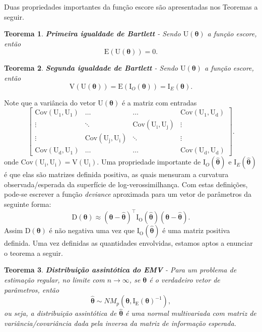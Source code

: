 \documentclass[
  9pt,
  a5paper,
]{book}
\newtheorem{theorem}{Teorema}[chapter]
\theoremstyle{definition}
\theoremstyle{definition}
\theoremstyle{definition}
\theoremstyle{definition}
\theoremstyle{remark}
\begin{document}
Duas propriedades importantes da função escore são apresentadas nos Teoremas a seguir.

\begin{theorem}
\protect\hypertarget{thm:EU}{}\label{thm:EU}\textbf{Primeira igualdade de Bartlett} - Sendo \(\mathrm{U}(\boldsymbol{\theta})\) a função escore, então
\[\mathrm{E}(\mathrm{U}(\boldsymbol{\theta})) = 0.\]
\end{theorem}

\begin{theorem}
\protect\hypertarget{thm:VU}{}\label{thm:VU}\textbf{Segunda igualdade de Bartlett} - Sendo \(\mathrm{U}(\boldsymbol{\theta})\) a função escore, então
\[\mathrm{V}(\mathrm{U}(\boldsymbol{\theta})) = \mathrm{E}(\mathrm{I}_O(\boldsymbol{\theta})) = \mathrm{I}_E(\boldsymbol{\theta}).\]
\end{theorem}

Note que a variância do vetor \(\mathrm{U}(\boldsymbol{\theta})\) é a matriz com entradas
\[ \left[\begin{array}{cccc}
 \mathrm{Cov}(\mathrm{U_1}, \mathrm{U_1})  & \ldots  &  \ldots & \mathrm{Cov}(\mathrm{U_1},\mathrm{U_d})  \\
  \vdots        & \ddots  &  \mathrm{Cov}(\mathrm{U_i}, \mathrm{U_j}) & \vdots \\
  \vdots        & \mathrm{Cov}(\mathrm{U_j}, \mathrm{U_i}) & \ddots & \vdots \\
\mathrm{Cov}(\mathrm{U_d},\mathrm{U_1}) & \ldots & \ldots & \mathrm{Cov}(\mathrm{U_d}, \mathrm{U_d}) 
\end{array}\right]. \]
onde \(\mathrm{Cov}(\mathrm{U_i}, \mathrm{U_i}) = \mathrm{V}(\mathrm{U_i})\). Uma propriedade importante de \(\mathrm{I}_O(\boldsymbol{\hat{\theta}})\) e \(\mathrm{I}_E(\boldsymbol{\hat{\theta}})\) é que elas são matrizes definida positiva, as quais mensuram a curvatura observada/esperada da superfície de log-verossimilhança. Com estas definições, pode-se escrever a função \emph{deviance} aproximada para um vetor de parâmetros da seguinte forma:
\[ \mathrm{D}(\boldsymbol{\theta}) \approx (\boldsymbol{\theta} - \boldsymbol{\hat{\theta}})^\top \mathrm{I_O}(\boldsymbol{\hat{\theta}})(\boldsymbol{\theta} - \boldsymbol{\hat{\theta}}) . \]
Assim \(\mathrm{D}(\boldsymbol{\theta})\) é não negativa uma vez que \(\mathrm{I_O}(\boldsymbol{\hat{\theta}})\) é uma matriz positiva definida.
Uma vez definidas as quantidades envolvidas, estamos aptos a enunciar o teorema a seguir.

\begin{theorem}
\protect\hypertarget{thm:DEMV}{}\label{thm:DEMV}\textbf{Distribuição assintótica do EMV} - Para um problema de estimação regular, no limite com \(n \to \infty\), se \(\boldsymbol{\theta}\) é o verdadeiro vetor de parâmetros, então
\[\hat{\boldsymbol{\theta}} \sim NM_p(\boldsymbol{\theta}, \mathrm{I_E}(\boldsymbol{\theta})^{-1}),\]
ou seja, a distribuição assintótica de \(\hat{\boldsymbol{\theta}}\) é uma normal multivariada com matriz de variância/covariância dada pela inversa da matriz de informação esperada.
\end{theorem}
\end{document}
